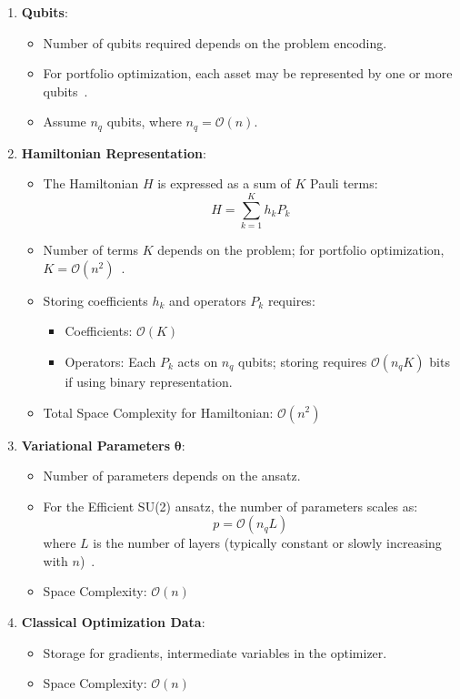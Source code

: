 \documentclass[%
 reprint,
 amsmath,amssymb,
 aps,
]{revtex4-2}
\begin{document}
\begin{enumerate} \item \textbf{Qubits}: \begin{itemize} \item Number of qubits required depends on the problem encoding. \item For portfolio optimization, each asset may be represented by one or more qubits~\cite{Woerner2019}. \item Assume $n_q$ qubits, where $n_q = \mathcal{O}(n)$. \end{itemize}

\item \textbf{Hamiltonian Representation}:
\begin{itemize}
    \item The Hamiltonian $H$ is expressed as a sum of $K$ Pauli terms:
    \begin{equation}
    H = \sum_{k=1}^{K} h_k P_k
    \end{equation}
    \item Number of terms $K$ depends on the problem; for portfolio optimization, $K = \mathcal{O}(n^2)$~\cite{Hodson2019}.
    \item Storing coefficients $h_k$ and operators $P_k$ requires:
    \begin{itemize}
        \item Coefficients: $\mathcal{O}(K)$
        \item Operators: Each $P_k$ acts on $n_q$ qubits; storing requires $\mathcal{O}(n_q K)$ bits if using binary representation.
    \end{itemize}
    \item Total Space Complexity for Hamiltonian: $\mathcal{O}(n^2)$
\end{itemize}

\item \textbf{Variational Parameters} $\boldsymbol{\theta}$:
\begin{itemize}
    \item Number of parameters depends on the ansatz.
    \item For the Efficient SU(2) ansatz, the number of parameters scales as:
    \begin{equation}
    p = \mathcal{O}(n_q L)
    \end{equation}
    where $L$ is the number of layers (typically constant or slowly increasing with $n$)~\cite{Kandala2017}.
    \item Space Complexity: $\mathcal{O}(n)$
\end{itemize}

\item \textbf{Classical Optimization Data}:
\begin{itemize}
    \item Storage for gradients, intermediate variables in the optimizer.
    \item Space Complexity: $\mathcal{O}(n)$
\end{itemize}
\end{enumerate}
\end{document}
